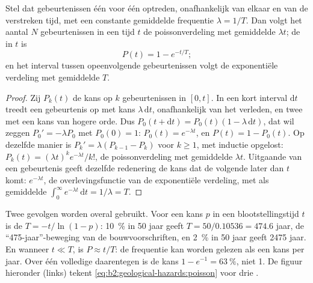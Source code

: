 \begin{proposition}\label{prop:b2:geological-hazards:poisson}
Stel dat gebeurtenissen één voor één optreden, onafhankelijk van elkaar
en van de verstreken tijd, met een constante gemiddelde frequentie $\lambda = 1/T$. Dan volgt het aantal $N$
gebeurtenissen in een tijd $t$ de poissonverdeling met gemiddelde $\lambda t$; de
 in $t$ is
\begin{equation}
P(t) = 1 - e^{-t/T};
\label{eq:b2:geological-hazards:poisson}
\end{equation}
en het interval tussen opeenvolgende gebeurtenissen volgt de exponentiële verdeling met gemiddelde $T$.
\end{proposition}

\begin{proof}
Zij $P_k(t)$ de kans op $k$ gebeurtenissen in $[0, t]$. In een kort interval $\mathrm{d}t$ treedt een
gebeurtenis op met kans $\lambda\,\mathrm{d}t$, onafhankelijk van het verleden, en twee met een
kans van hogere orde. Dus $P_0(t + \mathrm{d}t) = P_0(t)(1 - \lambda\,\mathrm{d}t)$, dat wil zeggen
$P_0' = -\lambda P_0$ met $P_0(0) = 1$: $P_0(t) = e^{-\lambda t}$, en $P(t) = 1 - P_0(t)$. Op dezelfde
manier is $P_k' = \lambda(P_{k-1} - P_k)$ voor $k \geq 1$, met inductie opgelost:
$P_k(t) = (\lambda t)^k e^{-\lambda t}/k!$, de poissonverdeling met gemiddelde $\lambda t$. Uitgaande van
een gebeurtenis geeft dezelfde redenering de kans dat de volgende later dan $t$ komt:
$e^{-\lambda t}$, de overlevingsfunctie van de exponentiële verdeling, met als gemiddelde
$\int_0^\infty e^{-\lambda t}\,\mathrm{d}t = 1/\lambda = T$.
\end{proof}

Twee gevolgen worden overal gebruikt. Voor een kans $p$ in een blootstellingstijd $t$ is de
 $T = -t/\ln(1 - p)$: \qty{10}{\percent} in 50 jaar geeft $T = 50/0.10536 =
474.6$ jaar, de ``475-jaar''-beweging van de bouwvoorschriften, en \qty{2}{\percent} in 50 jaar
geeft 2475 jaar. En wanneer $t \ll T$, is $P \approx t/T$: de frequentie kan worden gelezen als een
kans per jaar. Over één volledige  daarentegen is de kans $1 - e^{-1} =
\qty{63}{\percent}$, niet 1. De figuur hieronder (links) tekent \eqref{eq:b2:geological-hazards:poisson}
voor drie .

